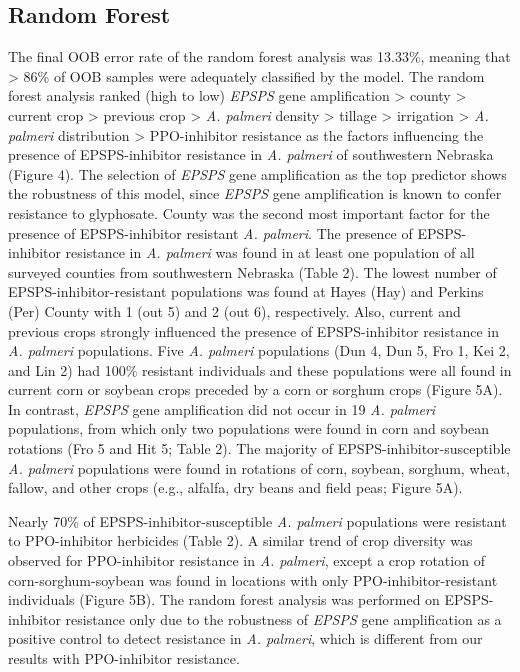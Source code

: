 \documentclass[10pt,letterpaper]{article}
\begin{document}
\hypertarget{random-forest-1}{%
\subsection{Random Forest}\label{random-forest-1}}

The final OOB error rate of the random forest analysis was 13.33\%,
meaning that \textgreater{} 86\% of OOB samples were adequately
classified by the model. The random forest analysis ranked (high to low)
\emph{EPSPS} gene amplification \textgreater{} county \textgreater{}
current crop \textgreater{} previous crop \textgreater{} \emph{A.
palmeri} density \textgreater{} tillage \textgreater{} irrigation
\textgreater{} \emph{A. palmeri} distribution \textgreater{}
PPO-inhibitor resistance as the factors influencing the presence of
EPSPS-inhibitor resistance in \emph{A. palmeri} of southwestern Nebraska
(Figure 4). The selection of \emph{EPSPS} gene amplification as the top
predictor shows the robustness of this model, since \emph{EPSPS} gene
amplification is known to confer resistance to glyphosate. County was
the second most important factor for the presence of EPSPS-inhibitor
resistant \emph{A. palmeri}. The presence of EPSPS-inhibitor resistance
in \emph{A. palmeri} was found in at least one population of all
surveyed counties from southwestern Nebraska (Table 2). The lowest
number of EPSPS-inhibitor-resistant populations was found at Hayes (Hay)
and Perkins (Per) County with 1 (out 5) and 2 (out 6), respectively.
Also, current and previous crops strongly influenced the presence of
EPSPS-inhibitor resistance in \emph{A. palmeri} populations. Five
\emph{A. palmeri} populations (Dun 4, Dun 5, Fro 1, Kei 2, and Lin 2)
had 100\% resistant individuals and these populations were all found in
current corn or soybean crops preceded by a corn or sorghum crops
(Figure 5A). In contrast, \emph{EPSPS} gene amplification did not occur
in 19 \emph{A. palmeri} populations, from which only two populations
were found in corn and soybean rotations (Fro 5 and Hit 5; Table 2). The
majority of EPSPS-inhibitor-susceptible \emph{A. palmeri} populations
were found in rotations of corn, soybean, sorghum, wheat, fallow, and
other crops (e.g., alfalfa, dry beans and field peas; Figure 5A).

Nearly 70\% of EPSPS-inhibitor-susceptible \emph{A. palmeri} populations
were resistant to PPO-inhibitor herbicides (Table 2). A similar trend of
crop diversity was observed for PPO-inhibitor resistance in \emph{A.
palmeri}, except a crop rotation of corn-sorghum-soybean was found in
locations with only PPO-inhibitor-resistant individuals (Figure 5B). The
random forest analysis was performed on EPSPS-inhibitor resistance only
due to the robustness of \emph{EPSPS} gene amplification as a positive
control to detect resistance in \emph{A. palmeri}, which is different
from our results with PPO-inhibitor resistance.
\end{document}
